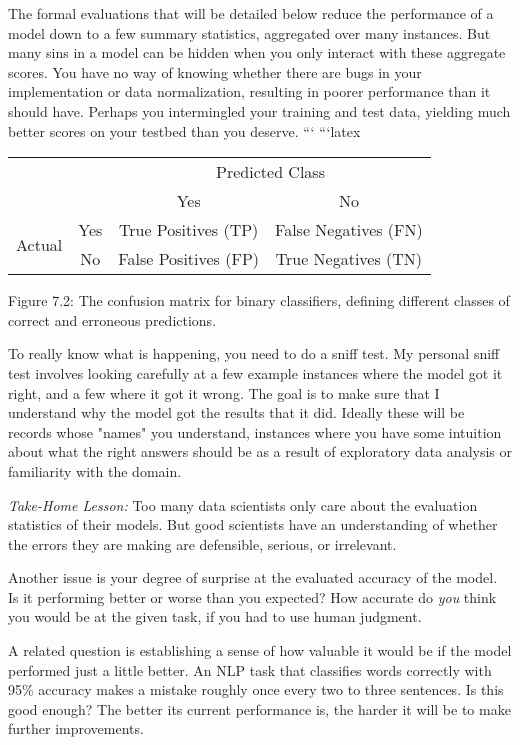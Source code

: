 \documentclass[10pt]{article}
\begin{document}
The formal evaluations that will be detailed below reduce the performance of a model down to a few summary statistics, aggregated over many instances. But many sins in a model can be hidden when you only interact with these aggregate scores. You have no way of knowing whether there are bugs in your implementation or data normalization, resulting in poorer performance than it should have. Perhaps you intermingled your training and test data, yielding much better scores on your testbed than you deserve.
```
```latex
\begin{tabular}{cc|cc}
 &  & \multicolumn{2}{|c}{Predicted Class} \\
 &  & Yes & No \\
\hline
\multirow{2}{*}{Actual} & Yes & True Positives (TP) & False Negatives (FN) \\
 & No & False Positives (FP) & True Negatives (TN) \\
\hline
\end{tabular}

\begin{center}
Figure 7.2: The confusion matrix for binary classifiers, defining different classes of correct and erroneous predictions.
\end{center}

To really know what is happening, you need to do a sniff test. My personal sniff test involves looking carefully at a few example instances where the model got it right, and a few where it got it wrong. The goal is to make sure that I understand why the model got the results that it did. Ideally these will be records whose "names" you understand, instances where you have some intuition about what the right answers should be as a result of exploratory data analysis or familiarity with the domain.

\textit{Take-Home Lesson:} Too many data scientists only care about the evaluation statistics of their models. But good scientists have an understanding of whether the errors they are making are defensible, serious, or irrelevant.

Another issue is your degree of surprise at the evaluated accuracy of the model. Is it performing better or worse than you expected? How accurate do \textit{you} think you would be at the given task, if you had to use human judgment.

A related question is establishing a sense of how valuable it would be if the model performed just a little better. An NLP task that classifies words correctly with 95\% accuracy makes a mistake roughly once every two to three sentences. Is this good enough? The better its current performance is, the harder it will be to make further improvements.
\end{document}
